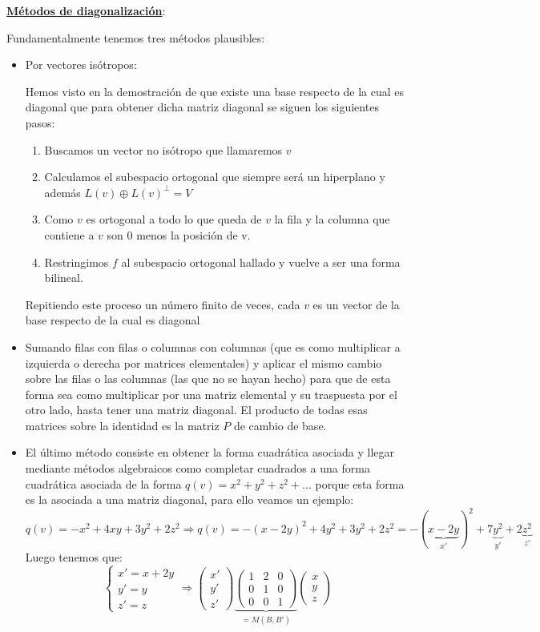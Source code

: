 \documentclass[10pt,a4paper,openright]{book}
\begin{document}
\underline{\textbf{Métodos de diagonalización}}:

Fundamentalmente tenemos tres métodos plausibles:
\begin{itemize}
\item Por vectores isótropos:

Hemos visto en la demostración de que existe una base respecto de la cual es diagonal que para obtener dicha matriz diagonal se siguen los siguientes pasos:
	\begin{enumerate}
	\item Buscamos un vector no isótropo que llamaremos $v$
	\item Calculamos el subespacio ortogonal que siempre será un hiperplano y además $L(v)\oplus L(v)^\perp = V$
	\item Como $v$ es ortogonal a todo lo que queda de $v$ la fila y la columna que contiene a $v$ son 0 menos la posición de v.
	\item Restringimos $f$ al subespacio ortogonal hallado y vuelve a ser una forma bilineal.
	\end{enumerate}
	Repitiendo este proceso un número finito de veces, cada $v$ es un vector de la base respecto de la cual es diagonal
	
\item Sumando filas con filas o columnas con columnas (que es como multiplicar a izquierda o derecha por matrices elementales) y aplicar el mismo cambio sobre las filas o las columnas (las que no se hayan hecho) para que de esta forma sea como multiplicar por una matriz elemental y su traspuesta por el otro lado, hasta tener una matriz diagonal. El producto de todas esas matrices sobre la identidad es la matriz $P$ de cambio de base.
	
\item El último método consiste en obtener la forma cuadrática asociada y llegar mediante métodos algebraicos como completar cuadrados a una forma cuadrática asociada de la forma $q(v) = x^2+y^2+z^2+...$ porque esta forma es la asociada a una matriz diagonal, para ello veamos un ejemplo:
$$q(v) = -x^2+4xy+3y^2+2z^2 \Rightarrow q(v)= -(x-2y)^2+4y^2+3y^2+2z^2 =-(\underbrace{x-2y}_{x'})^2+7\underbrace{y^2}_{y'}+2\underbrace{z^2}_{z'} $$
Luego tenemos que:
$$\begin{cases} x' = x+2y \\ y' = y \\ z'=z\end{cases}\Rightarrow
\begin{pmatrix}x' \\ y' \\ z'\end{pmatrix} \underbrace{\begin{pmatrix} 1 & 2 & 0 \\ 0 & 1 & 0 \\ 0 & 0 & 1\end{pmatrix}}_{=M(B,B')} \begin{pmatrix}x \\ y \\ z\end{pmatrix}$$
\end{itemize}
\end{document}
